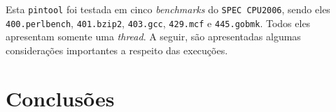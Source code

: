 \documentclass[12pt]{article}
\begin{document}
Esta \texttt{pintool} foi testada em cinco \textit{benchmarks} do
\texttt{SPEC CPU2006}, sendo eles \texttt{400.perlbench}, \texttt{401.bzip2},
\texttt{403.gcc}, \texttt{429.mcf}  e \texttt{445.gobmk}. Todos eles apresentam
somente uma \textit{thread}. A seguir, são apresentadas algumas considerações
importantes a respeito das execuções.

\section{Conclusões}




\end{document}
